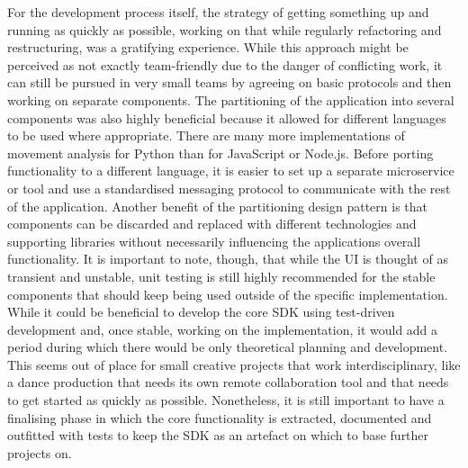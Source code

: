 For the development process itself, the strategy of getting something up and running as quickly as possible, working on that while regularly refactoring and restructuring, was a gratifying experience.
While this approach might be perceived as not exactly team-friendly due to the danger of conflicting work, it can still be pursued in very small teams by agreeing on basic protocols and then working on separate components.
The partitioning of the application into several components was also highly beneficial because it allowed for different languages to be used where appropriate.
There are many more implementations of movement analysis for Python than for JavaScript or Node.js.
Before porting functionality to a different language, it is easier to set up a separate microservice or tool and use a standardised messaging protocol to communicate with the rest of the application.
Another benefit of the partitioning design pattern is that components can be discarded and replaced with different technologies and supporting libraries without necessarily influencing the application\textquotesingle s overall functionality.
It is important to note, though, that while the \ac{UI} is thought of as transient and unstable, unit testing is still highly recommended for the stable components that should keep being used outside of the specific implementation.
While it could be beneficial to develop the core \ac{SDK} using test-driven development and, once stable, working on the implementation, it would add a period during which there would be only theoretical planning and development.
This seems out of place for small creative projects that work interdisciplinary, like a dance production that needs its own remote collaboration tool and that needs to get started as quickly as possible.
Nonetheless, it is still important to have a finalising phase in which the core functionality is extracted, documented and outfitted with tests to keep the \ac{SDK} as an artefact on which to base further projects on.
